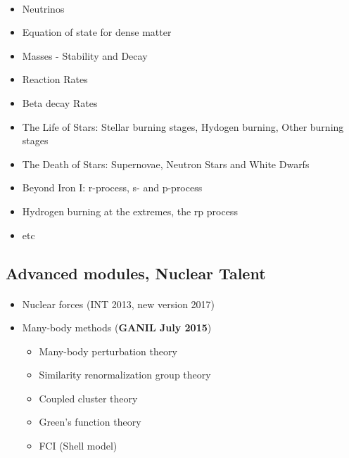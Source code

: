 \documentclass[%
twoside,                 %
final,                   %
10pt]{article}
\begin{document}
\paragraph{}
\begin{itemize}
\item Neutrinos

\item Equation of state for dense matter

\item Masses - Stability and Decay

\item Reaction Rates

\item Beta decay Rates	

\item The Life of Stars: Stellar burning stages, Hydogen burning, Other burning stages

\item The Death of Stars: Supernovae, Neutron Stars and White Dwarfs

\item Beyond Iron I: r-process, s- and p-process

\item Hydrogen burning at the extremes, the rp process

\item etc
\end{itemize}

\noindent




\subsection*{Advanced  modules, Nuclear Talent}

\paragraph{}
\begin{itemize}
\item Nuclear forces (INT 2013, new version 2017)

\item Many-body methods (\textbf{GANIL July 2015})
\begin{itemize}

  \item Many-body perturbation theory

  \item Similarity renormalization group theory

  \item Coupled cluster theory

  \item Green's function theory

  \item FCI (Shell model)
\end{itemize}

\noindent
\end{itemize}
\end{document}
